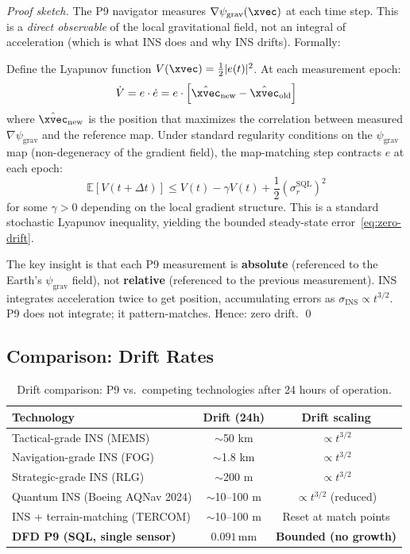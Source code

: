 \documentclass[11pt]{article}
\theoremstyle{definition}
\theoremstyle{remark}
\newcommand{\psigrav}{\psi_{\mathrm{grav}}}
\newcommand{\SQL}{\mathrm{SQL}}
\begin{document}
\begin{proof}[Proof sketch]
The P9 navigator measures $\nabla\psigrav(\xvec)$ at each time step. This is
a \emph{direct observable} of the local gravitational field, not an integral
of acceleration (which is what INS does and why INS drifts). Formally:

Define the Lyapunov function $V(\xvec) = \frac{1}{2}|e(t)|^2$. At each
measurement epoch:
\begin{equation}
\dot{V} = e \cdot \dot{e} = e \cdot \left[\hat{\xvec}_{\mathrm{new}} - \hat{\xvec}_{\mathrm{old}}\right]
\end{equation}
where $\hat{\xvec}_{\mathrm{new}}$ is the position that maximizes the
correlation between measured $\nabla\psigrav$ and the reference map.
Under standard regularity conditions on the $\psigrav$ map (non-degeneracy
of the gradient field), the map-matching step contracts $e$ at each epoch:
\begin{equation}
\mathbb{E}[V(t+\Delta t)] \leq V(t) - \gamma V(t) + \frac{1}{2}(\sigma_r^{\SQL})^2
\end{equation}
for some $\gamma > 0$ depending on the local gradient structure. This is a
standard stochastic Lyapunov inequality, yielding the bounded steady-state
error~\eqref{eq:zero-drift}.

The key insight is that each P9 measurement is \textbf{absolute} (referenced to
the Earth's $\psigrav$ field), not \textbf{relative} (referenced to the previous
measurement). INS integrates acceleration twice to get position, accumulating
errors as $\sigma_{\mathrm{INS}} \propto t^{3/2}$. P9 does not integrate;
it pattern-matches. Hence: zero drift. \qed
\end{proof}

\subsection{Comparison: Drift Rates}

\begin{table}[H]
\centering
\caption{Drift comparison: P9 vs.\ competing technologies after 24 hours of operation.}
\label{tab:drift-comparison}
\begin{tabular}{@{}lcc@{}}
\toprule
Technology & Drift (24h) & Drift scaling \\
\midrule
Tactical-grade INS (MEMS) & $\sim$50 km & $\propto t^{3/2}$ \\
Navigation-grade INS (FOG) & $\sim$1.8 km & $\propto t^{3/2}$ \\
Strategic-grade INS (RLG) & $\sim$200 m & $\propto t^{3/2}$ \\
Quantum INS (Boeing AQNav 2024) & $\sim$10--100 m & $\propto t^{3/2}$ (reduced) \\
INS + terrain-matching (TERCOM) & $\sim$10--100 m & Reset at match points \\
\textbf{DFD P9 (SQL, single sensor)} & $\mathbf{0.091\,\mathrm{mm}}$ & \textbf{Bounded (no growth)} \\
\bottomrule
\end{tabular}
\end{table}
\end{document}

